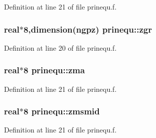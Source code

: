 Definition at line 21 of file prinequ.f.\hypertarget{namespaceprinequ_fa746dd8a2614f015972663b4d587fd2}{
\subsubsection[zgr]{\setlength{\rightskip}{0pt plus 5cm}real$\ast$8,dimension(ngpz) {\bf prinequ::zgr}}}
\label{namespaceprinequ_fa746dd8a2614f015972663b4d587fd2}




Definition at line 20 of file prinequ.f.\hypertarget{namespaceprinequ_2eef48f5c40af1c24381aed32f643c19}{
\subsubsection[zma]{\setlength{\rightskip}{0pt plus 5cm}real$\ast$8 {\bf prinequ::zma}}}
\label{namespaceprinequ_2eef48f5c40af1c24381aed32f643c19}




Definition at line 21 of file prinequ.f.\hypertarget{namespaceprinequ_60a29e973631324ed2ad950585ad50d4}{
\subsubsection[zmsmid]{\setlength{\rightskip}{0pt plus 5cm}real$\ast$8 {\bf prinequ::zmsmid}}}
\label{namespaceprinequ_60a29e973631324ed2ad950585ad50d4}




Definition at line 21 of file prinequ.f.